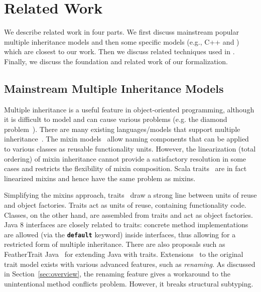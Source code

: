 \section{Related Work}\label{sec:relatedwork}
We describe related work in four parts. We first discuss mainstream popular multiple 
inheritance models and then some specific models (e.g., C++ and \csharp) which are closest to our work. Then we 
discuss related techniques used in \self. Finally, we discuss the foundation and related work of our formalization.

\subsection{Mainstream Multiple Inheritance Models}
Multiple inheritance is a useful feature in object-oriented
programming, although it is difficult to model and can 
cause various problems (e.g. the diamond problem~\cite{Sak89dis,Singh1995}).  
There are many existing languages/models that support multiple 
inheritance~\cite{ellis1990annotated,scala-overview,bracha90mixin,scharli03traits,malayeri2009cz,csharpdoc,Moon1986,Flatt1998,Ancona2003}. 
The mixin models~\cite{bracha90mixin,Flatt1998,van1996encapsulation,Ancona2003,Hendler86} allow naming components 
that can be applied to various classes as reusable functionality units. However, the linearization (total ordering) of mixin 
inheritance cannot provide a satisfactory resolution in some cases and restricts the flexibility of mixin composition. 
Scala traits~\cite{scala-overview} are in fact linearized mixins and hence have the same problem as mixins.

Simplifying the mixins approach, traits~\cite{scharli03traits,Ducasse:2006:TMF:1119479.1119483} draw a
strong line between units of reuse and object factories. Traits act
as units of reuse, containing functionality code. Classes, on the
other hand, are
assembled from traits and act as object factories. Java 8
interfaces are closely related to traits: concrete method
implementations are allowed (via the \textbf{\texttt{default}}
keyword) inside interfaces, thus allowing for a restricted form 
of multiple inheritance.
There are also proposals such as FeatherTrait Java~\cite{Liquori08ftj} 
for extending Java with traits. Extensions~\cite{reppy2006foundation,Reppy:2007:MT:2394758.2394784} to 
the original trait model exists with various advanced features, such as \emph{renaming}. As discussed in Section~\ref{sec:overview},
the renaming feature gives a workaround to the unintentional method conflicts
problem. However, it breaks structural subtyping.

